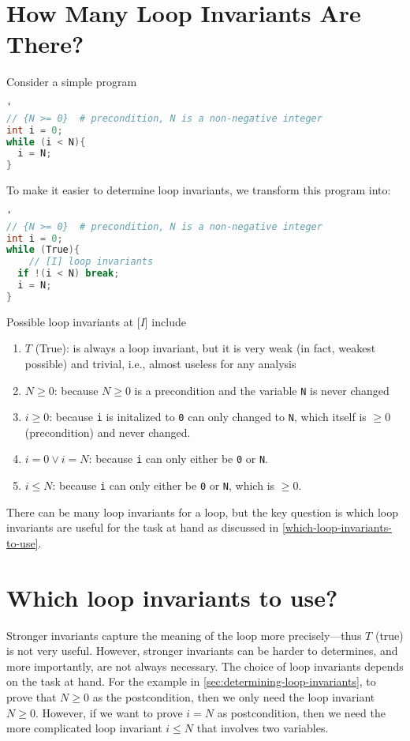 \documentclass[oneside,11pt,dvipsnames]{book}
\begin{document}
\section{How Many Loop Invariants Are There?}\label{sec:determining-loop-invariants}

Consider a simple
program

\begin{lstlisting}[language=C]'
// {N >= 0}  # precondition, N is a non-negative integer
int i = 0;
while (i < N){
  i = N;
}
\end{lstlisting}

To make it easier to determine loop invariants, we transform
this program into:

\begin{lstlisting}[language=C]'
// {N >= 0}  # precondition, N is a non-negative integer
int i = 0;
while (True){
    // [I] loop invariants 
  if !(i < N) break;
  i = N;
}
\end{lstlisting}

Possible loop invariants at [$I$] include

\begin{enumerate}
\item
  $T$  (True): is always a loop invariant, but it is very weak (in fact, weakest possible) and trivial, i.e., almost useless for any analysis
\item $N \ge 0$: because $N \ge 0$ is a precondition and the variable \texttt{N} is never changed
\item $i \ge 0$: because \texttt{i} is initalized to
  \texttt{0} can only changed to \texttt{N}, which itself is
  $\ge 0$ (precondition) and never changed.
\item  $i = 0 \vee i = N$: because \texttt{i} can only either be \texttt{0} or \texttt{N}.
\item  $i \le N$: because \texttt{i} can only either be \texttt{0} or \texttt{N}, which is $\ge 0$.
\end{enumerate}

There can be many loop invariants for a loop, but the key question is which loop invariants are useful for the task at hand as discussed in \autoref{which-loop-invariants-to-use}.
\section{Which loop invariants to
use?}\label{which-loop-invariants-to-use}

Stronger invariants capture the meaning of the loop more precisely---thus $T$ (true) is not very useful.
However, stronger invariants can be harder to determines, and more importantly, are not always necessary. The choice of loop invariants depends on the task at hand. For the example in \autoref{sec:determining-loop-invariants},  to prove that $N \ge 0$ as the postcondition, then we only need the loop invariant $N \ge 0$. However, if we want to prove  $i=N$ as postcondition, then we need the more complicated loop invariant $i\le N$ that involves two variables.
\end{document}

